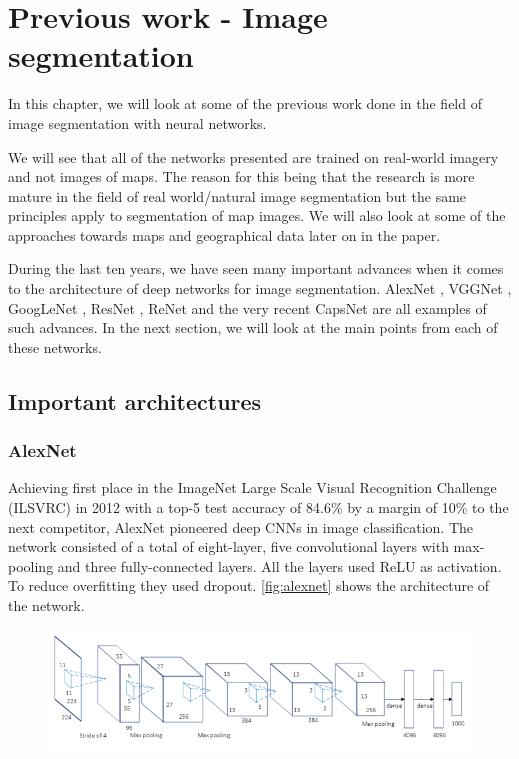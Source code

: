 \chapter{Previous work - Image segmentation}\label{sec:previous-work-segmentation}
In this chapter, we will look at some of the previous work done in the field of image segmentation with neural networks. 

We will see that all of the networks presented are trained on real-world imagery and not images of maps. The reason for this being that the research is more mature in the field of real world/natural image segmentation but the same principles apply to segmentation of map images. We will also look at some of the approaches towards maps and geographical data later on in the paper.

During the last ten years, we have seen many important advances when it comes to the architecture of deep networks for image segmentation. AlexNet \cite{Krizhevsky2012}, VGGNet \cite{Simonyan2014a}, GoogLeNet \cite{Szegedy2014}, ResNet \cite{He2015}, ReNet \cite{Visin2015} and the very recent CapsNet \cite{Sabour2017} are all examples of such advances. In the next section, we will look at the main points from each of these networks.

\section{Important architectures}\label{sec:important-architectures}

\subsection{AlexNet}
Achieving first place in the ImageNet Large Scale Visual Recognition Challenge (ILSVRC) \cite{Russakovsky2015}  in 2012 with a top-5 test accuracy of 84.6\% by a margin of 10\% to the next competitor, AlexNet pioneered deep CNNs in image classification. The network consisted of a total of eight-layer, five convolutional layers with max-pooling and three fully-connected layers. All the layers used ReLU as activation. To reduce overfitting they used dropout. \autoref{fig:alexnet} shows the architecture of the network.

\begin{figure}[H]
	\centering
	\includegraphics[width=0.7\linewidth]{fig/alexnet.png}
	\label{fig:alexnet}
\end{figure}


